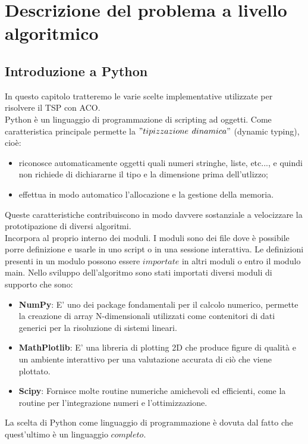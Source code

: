 \documentclass[a4paper,12pt]{report}
\begin{document}
\chapter{Descrizione del problema a livello algoritmico}
\section{Introduzione a Python}
In questo capitolo tratteremo le varie scelte implementative utilizzate per risolvere il TSP con ACO.\\
Python è un linguaggio di programmazione di scripting ad oggetti. Come caratteristica principale permette la $"tipizzazione$ $dinamica"$ (dynamic typing), cioè:
\begin{itemize}
    \item riconosce automaticamente oggetti quali numeri stringhe, liste, etc..., e quindi non richiede di dichiararne il tipo e la dimensione prima dell'utlizzo;
\end{itemize}
\begin{itemize}
    \item effettua in modo automatico l'allocazione e la gestione della memoria.
\end{itemize}
Queste caratteristiche contribuiscono in modo davvere sostanziale a velocizzare la prototipazione di diversi algoritmi.\\
Incorpora al proprio interno dei moduli. I moduli sono dei file dove è possibile porre definizione e usarle in uno script o in una sessione interattiva. Le definizioni presenti in un modulo possono essere $importate$ in altri moduli o entro il modulo main. 
Nello sviluppo dell'algoritmo sono stati importati diversi moduli di supporto che sono:
\begin{itemize}
    \item \textbf{NumPy}: E' uno dei package fondamentali per il calcolo numerico, permette la creazione di array N-dimensionali utilizzati come contenitori di dati generici per la risoluzione di sistemi lineari.
\end{itemize}
\begin{itemize}
    \item \textbf{MathPlotlib}: E' una libreria di plotting 2D che produce figure di qualità e un ambiente interattivo per una valutazione accurata di ciò che viene plottato.
\end{itemize}
\begin{itemize}
    \item \textbf{Scipy}: Fornisce molte routine numeriche amichevoli ed efficienti, come la routine per l'integrazione numeri e l'ottimizzazione.
\end{itemize}
La scelta di Python come linguaggio di programmazione è dovuta dal fatto che quest'ultimo è un linguaggio $completo$.
\end{document}
